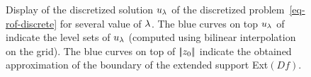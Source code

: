\begin{figure}[H]
\begin{center}
\caption{\label{fig-results} 
Display of the discretized solution $u_{\lambda}$ of the discretized problem~\eqref{eq-rof-discrete} for several value of $\lambda$. The blue curves on top $u_{\lambda}$ of indicate the level sets of $u_{\lambda}$ (computed using bilinear interpolation on the grid). The blue curves on top of $|\!| z_0 |\!|$ indicate the obtained approximation of the boundary of the extended support Ext$(Df)$.
}
\end{center}
\end{figure}
